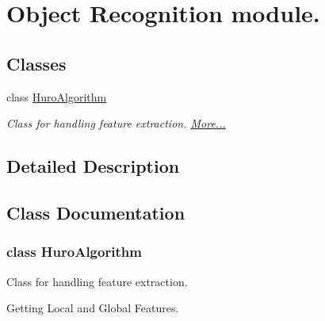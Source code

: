 \hypertarget{group___object_recognition}{\section{Object Recognition module.}
\label{group___object_recognition}
}
\subsection*{Classes}
\begin{DoxyCompactItemize}
\item 
class \hyperlink{group___object_recognition_class_huro_algorithm}{Huro\-Algorithm}
\begin{DoxyCompactList}\small\item\em Class for handling feature extraction.  \hyperlink{group___object_recognition_class_huro_algorithm}{More...}\end{DoxyCompactList}\end{DoxyCompactItemize}


\subsection{Detailed Description}


\subsection{Class Documentation}
\label{class_huro_algorithm}
\hypertarget{group___object_recognition_class_huro_algorithm}{}
\subsubsection{class Huro\-Algorithm}
Class for handling feature extraction. 

Getting Local and Global Features. 

